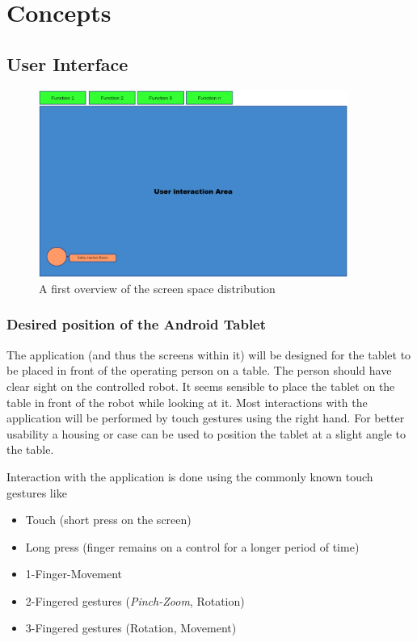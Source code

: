 \chapter{Concepts}
\label{chap:concepts}

\section{User Interface}

\begin{figure}
	\caption{\label{fig:firstmockup}A first overview of the screen space distribution}
	\includegraphics[width=0.9\textwidth]{assets/chpt_concepts/main_touch_interface.png}
\end{figure}

\subsection{Desired position of the Android Tablet}
The application (and thus the screens within it) will be designed for the tablet to be placed in front of the operating person on a table. The person should have clear sight on the controlled robot. It seems sensible to place the tablet on the table in front of the robot while looking at it. Most interactions with the application will be performed by touch gestures using the right hand. For better usability a housing or case can be used to position the tablet at a slight angle to the table. 

Interaction with the application is done using the commonly known touch gestures like
\begin{itemize}
	\item Touch (short press on the screen)
	\item Long press (finger remains on a control for a longer period of time)
	\item 1-Finger-Movement
	\item 2-Fingered gestures (\textit{Pinch-Zoom}, Rotation)
	\item 3-Fingered gestures (Rotation, Movement)
\end{itemize}

